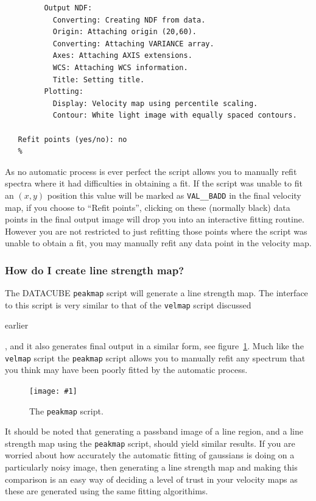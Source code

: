 \documentclass[twoside,11pt]{article}
\newcommand{\htmladdimg}[1]{}
\newcommand{\htmlref}[2]{#1}
\newcommand{\xref}[3]{#1}
\newcommand{\myfig} [5] {
  \begin{figure}
    \centering\texttt{[image: \#1]}
    \typeout{#1 inserted on page \arabic{page}}
    \caption{\label{#4}#5}
  \end{figure}
  }
\newcommand{\myfig}[5]{
    \label{#4} \htmladdimg{#3}\\
    Figure: #5\\
    }
\begin{document}
\begin{verbatim}
         Output NDF:
           Converting: Creating NDF from data.
           Origin: Attaching origin (20,60).
           Converting: Attaching VARIANCE array.
           Axes: Attaching AXIS extensions.
           WCS: Attaching WCS information.
           Title: Setting title.
         Plotting:
           Display: Velocity map using percentile scaling.
           Contour: White light image with equally spaced contours.
 
   Refit points (yes/no): no
   %
\end{verbatim}\normalsize

As no automatic process is ever perfect the script allows you to manually refit spectra where it had difficulties in obtaining a fit. If the script was unable to fit an $(x,y)$ position this value will be marked as {\tt VAL\_\_BADD} in the final velocity map, if you choose to ``Refit points'', clicking on these (normally black) data points in the final output image will drop you into an interactive fitting routine. However you are not restricted to just refitting those points where the script was unable to obtain a fit, you may manually refit any data point in the velocity map.

\subsubsection{How do I create line strength map?}

The DATACUBE \xref{{\tt peakmap}}{sun237}{peakmap} script will generate a line strength map. The interface to this script is very similar to that of the \xref{{\tt velmap}}{sun237}{velmap} script discussed 
\begin{htmlonly}
\htmlref{earlier}{sc16_velmap}
\end{htmlonly}
, and it also generates final output in a similar form, see figure~\ref{sc16_peakmap_fig}. Much like the {\tt velmap} script the {\tt peakmap} script allows you to manually refit any spectrum that you think may have been poorly fitted by the automatic process.

\myfig{sc16_peakmap.eps}{height=0.4\textheight}{sc16_peakmap.gif}{sc16_peakmap_fig}{The {\tt peakmap} script.}

It should be noted that generating a \xref{passband image}{sun237}{passband} of a line region, and a line strength map using the {\tt peakmap} script, should yield similar results. If you are worried about how accurately the automatic fitting of gaussians is doing on a particularly noisy image, then generating a line strength map and making this comparison is an easy way of deciding a level of trust in your \htmlref{velocity maps}{sc16_velmap} as these are generated using the same fitting algorithims.
\end{document}
